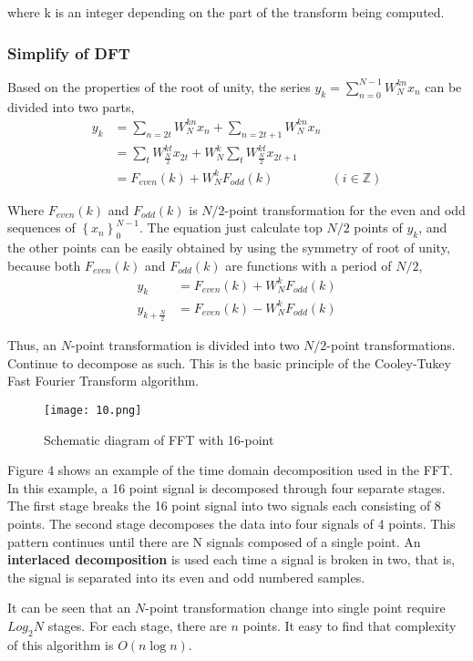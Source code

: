 \documentclass[12pt,a4paper]{article}
\begin{document}
where k is an integer depending on the part of the transform being computed. 


\subsubsection{Simplify of DFT}
Based on the properties of the root of unity, the series  $ y_{k}=\sum _{n=0}^{N-1}W_{N}^{kn}x_{n}$ can be divided into two parts,
\begin{align*}
y_{k} &=\sum_{n=2t}W_{N}^{kn}x_{n}+\sum_{n=2t+1}W_{N}^{kn}x_{n}\\
&=\sum_{t}W _{\frac {N}{2}}^{kt}x_{2t}+W _{N}^{k}\sum _{t}W _{\frac {N}{2}}^{kt}x_{2t+1}\\
&=F_{even}(k)+W _{N}^{k}F_{odd}(k)&(i\in \mathbb {Z} )
\end{align*}

Where $F_{even}(k)$ and $F_{odd}(k)$ is $N/2$-point transformation for the even and odd sequences of $\left\{x_n \right\}^{N-1}_0$.\cite{wiki:xxx} The equation just calculate top $N/2$ points of $y_k$, and the other points can be easily obtained by using the symmetry of root of unity, because both $F_{even}(k)$ and $F_{odd}(k)$ are functions with a period of $N/2$,
\begin{align*}
y_{k}&=F_{even}(k)+W_{N}^{k}F_{odd}(k)\\
y_{k+{\frac {N}{2}}}&=F_{even}(k)-W_{N}^{k}F_{odd}(k)
\end{align*}

Thus, an $N$-point transformation is divided into two $N/2$-point transformations. Continue to decompose as such. This is the basic principle of the Cooley-Tukey Fast Fourier Transform algorithm. 
\begin{figure}[hbtp]
\centering
\texttt{[image: 10.png]}
\caption{Schematic diagram of FFT with 16-point}
\end{figure}

Figure 4 shows an example of the time domain decomposition used in the
FFT. In this example, a 16 point signal is decomposed through four separate stages. The first stage breaks the 16 point signal into two signals each
consisting of 8 points. The second stage decomposes the data into four signals
of 4 points. This pattern continues until there are N signals composed of a
single point. An \textbf{interlaced decomposition} is used each time a signal is
broken in two, that is, the signal is separated into its even and odd numbered
samples. \cite{smith1997scientist}

It can be seen that an $N$-point transformation change into single point require $Log_2 N$ stages. For each stage, there are $n$ points. It easy to find that complexity of this algorithm is $O(n\log n)$.
\end{document}
